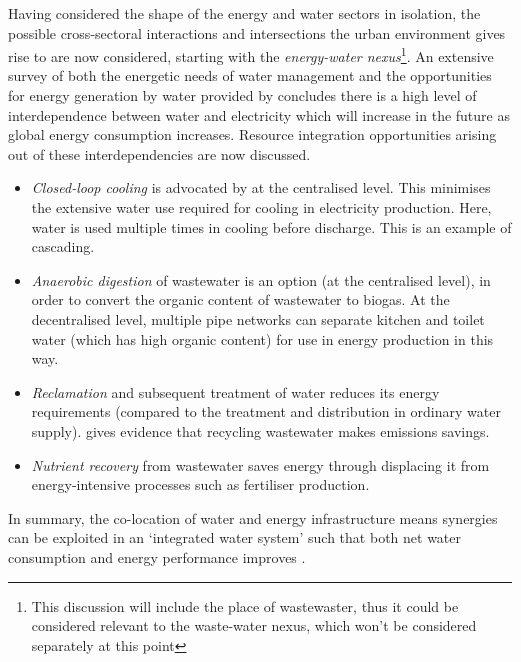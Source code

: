 Having considered the shape of the energy and water sectors in isolation, the possible cross-sectoral interactions and intersections the urban environment gives rise to are now considered, starting with the \emph{energy-water nexus}\footnote{This discussion will include the place of wastewaster, thus it could be considered relevant to the waste-water nexus, which won't be considered separately at this point}. An extensive survey of both the energetic needs of water management and the opportunities for energy generation by water provided by \citet{McMahon2011} concludes there is a high level of interdependence between water and electricity which will increase in the future as global energy consumption increases. Resource integration opportunities arising out of these interdependencies are now discussed.
\begin{itemize}
	\item \emph{Closed-loop cooling} is advocated by \citet{McMahon2011} at the centralised level. This minimises the extensive water use required for cooling in electricity production. Here, water is used multiple times in cooling before discharge. This is an example of cascading.
	\item \emph{Anaerobic digestion} of wastewater is an option (at the centralised level), in order to convert the organic content of wastewater to biogas. At the decentralised level, multiple pipe networks can separate kitchen and toilet water (which has high organic content) for use in energy production in this way.
	\item \emph{Reclamation} and subsequent treatment of water reduces its energy requirements (compared to the treatment and distribution in ordinary water supply). \citet{Lundin2000} gives evidence that recycling wastewater makes emissions savings.
	\item \emph{Nutrient recovery} from wastewater saves energy through displacing it from  energy-intensive processes such as fertiliser production. 
\end{itemize}
In summary, the co-location of water and energy infrastructure means synergies can be exploited in an `integrated water system' such that both net water consumption and energy performance improves \citep{Makropoulos2008}.


